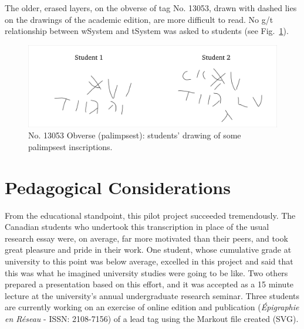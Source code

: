 \documentclass[amsthm,ebook]{saparticle}
\begin{document}

The older, erased layers, on the obverse of tag No. 13053, drawn with dashed lies on the drawings of the academic edition, are more difficult to read. No
g/t relationship between wSystem and tSystem was asked to students (see Fig.~\ref{fig:4}).

\begin{figure}[!hbp]
\centering
\includegraphics[scale=0.25]{EAGLE16lameetalteaching-img012.png}
\caption{No. 13053 Obverse (palimpsest): students' drawing of some palimpsest inscriptions.}
\label{fig:4}
\end{figure}


\section{Pedagogical Considerations}


\noindent From the educational standpoint, this pilot project succeeded tremendously. The Canadian students who undertook this
transcription in place of the usual research essay were, on average, far more motivated than their peers, and took
great pleasure and pride in their work. One student, whose cumulative grade at university to this point was below
average, excelled in this project and said that this was what he imagined university studies were going to be like. Two
others prepared a presentation based on this effort, and it was accepted as a 15 minute lecture at the university’s
annual undergraduate research seminar. Three students are currently working on an exercise of online edition and publication (\emph{Épigraphie en Réseau} - ISSN: 2108-7156) of a lead tag using the Markout file created (SVG).
\end{document}
